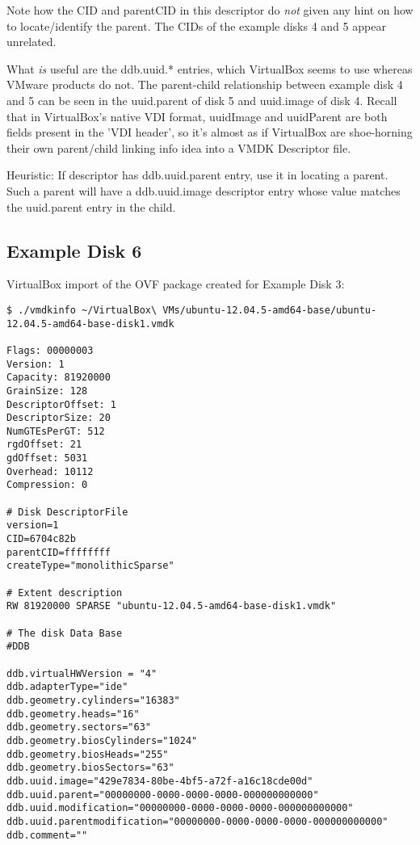 \documentclass{article}
\begin{document}
Note how the CID and parentCID in this descriptor do {\em not} given
any hint on how to locate/identify the parent. The CIDs of the example
disks 4 and 5 appear unrelated.

What {\em is} useful are the ddb.uuid.* entries, which VirtualBox
seems to use whereas VMware products do not.  The parent-child
relationship between example disk 4 and 5 can be seen in the
uuid.parent of disk 5 and uuid.image of disk 4.  Recall that in
VirtualBox's native VDI format, uuidImage and uuidParent are both
fields present in the 'VDI header', so it's almost as if VirtualBox
are shoe-horning their own parent/child linking info idea into a VMDK
Descriptor file.


Heuristic: If descriptor has ddb.uuid.parent entry, use it in locating
a parent.  Such a parent will have a ddb.uuid.image descriptor entry
whose value matches the uuid.parent entry in the child.


\subsection{Example Disk 6}

VirtualBox import of the OVF package created for Example Disk 3:

\begin{verbatim}
$ ./vmdkinfo ~/VirtualBox\ VMs/ubuntu-12.04.5-amd64-base/ubuntu-12.04.5-amd64-base-disk1.vmdk 

Flags: 00000003
Version: 1
Capacity: 81920000
GrainSize: 128
DescriptorOffset: 1
DescriptorSize: 20
NumGTEsPerGT: 512
rgdOffset: 21
gdOffset: 5031
Overhead: 10112
Compression: 0

# Disk DescriptorFile
version=1
CID=6704c82b
parentCID=ffffffff
createType="monolithicSparse"

# Extent description
RW 81920000 SPARSE "ubuntu-12.04.5-amd64-base-disk1.vmdk"

# The disk Data Base 
#DDB

ddb.virtualHWVersion = "4"
ddb.adapterType="ide"
ddb.geometry.cylinders="16383"
ddb.geometry.heads="16"
ddb.geometry.sectors="63"
ddb.geometry.biosCylinders="1024"
ddb.geometry.biosHeads="255"
ddb.geometry.biosSectors="63"
ddb.uuid.image="429e7834-80be-4bf5-a72f-a16c18cde00d"
ddb.uuid.parent="00000000-0000-0000-0000-000000000000"
ddb.uuid.modification="00000000-0000-0000-0000-000000000000"
ddb.uuid.parentmodification="00000000-0000-0000-0000-000000000000"
ddb.comment=""
\end{verbatim}
\end{document}
